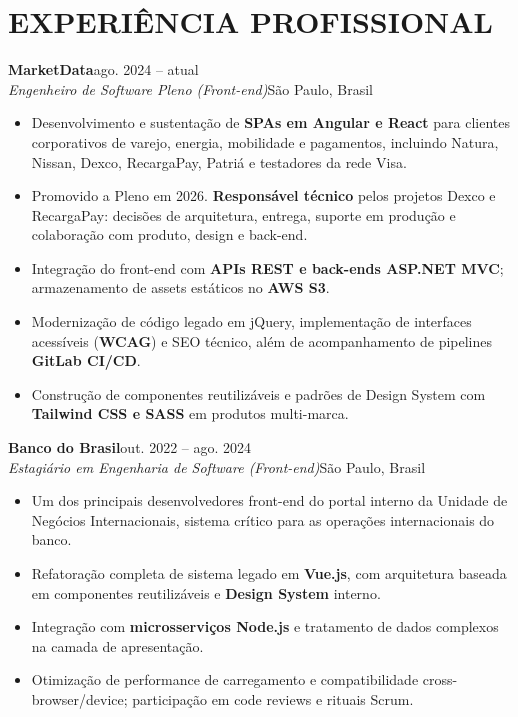 ﻿\documentclass[10pt,a4paper]{article}
\newcommand{\role}[4]{%
  \textbf{#1}\hfill #2\\[1pt]
  \textit{#3}\hfill #4\par\vspace{1.5pt}
}
\begin{document}
\section*{EXPERI\^ENCIA PROFISSIONAL}

\role{MarketData}{ago. 2024 -- atual}{Engenheiro de Software Pleno (Front-end)}{S\~ao Paulo, Brasil}
\begin{itemize}
  \item Desenvolvimento e sustenta\c{c}\~ao de \textbf{SPAs em Angular e React} para clientes corporativos de varejo, energia, mobilidade e pagamentos, incluindo Natura, Nissan, Dexco, RecargaPay, Patri\'a e testadores da rede Visa.
  \item Promovido a Pleno em 2026. \textbf{Respons\'avel t\'ecnico} pelos projetos Dexco e RecargaPay: decis\~oes de arquitetura, entrega, suporte em produ\c{c}\~ao e colabora\c{c}\~ao com produto, design e back-end.
  \item Integra\c{c}\~ao do front-end com \textbf{APIs REST e back-ends ASP.NET MVC}; armazenamento de assets est\'aticos no \textbf{AWS S3}.
  \item Moderniza\c{c}\~ao de c\'odigo legado em jQuery, implementa\c{c}\~ao de interfaces acess\'iveis (\textbf{WCAG}) e SEO t\'ecnico, al\'em de acompanhamento de pipelines \textbf{GitLab CI/CD}.
  \item Constru\c{c}\~ao de componentes reutiliz\'aveis e padr\~oes de Design System com \textbf{Tailwind CSS e SASS} em produtos multi-marca.
\end{itemize}

\role{Banco do Brasil}{out. 2022 -- ago. 2024}{Estagi\'ario em Engenharia de Software (Front-end)}{S\~ao Paulo, Brasil}
\begin{itemize}
  \item Um dos principais desenvolvedores front-end do portal interno da Unidade de Neg\'ocios Internacionais, sistema cr\'itico para as opera\c{c}\~oes internacionais do banco.
  \item Refatora\c{c}\~ao completa de sistema legado em \textbf{Vue.js}, com arquitetura baseada em componentes reutiliz\'aveis e \textbf{Design System} interno.
  \item Integra\c{c}\~ao com \textbf{microsservi\c{c}os Node.js} e tratamento de dados complexos na camada de apresenta\c{c}\~ao.
  \item Otimiza\c{c}\~ao de performance de carregamento e compatibilidade cross-browser/device; participa\c{c}\~ao em code reviews e rituais Scrum.
\end{itemize}
\end{document}

